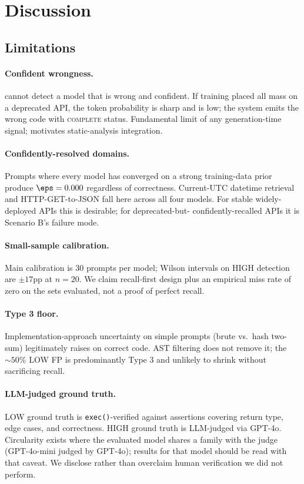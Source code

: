 \section{Discussion}
\label{sec:discussion}

\subsection{Limitations}
\label{subsec:limitations}

\paragraph{Confident wrongness.} \eps cannot detect a model that is
wrong and confident. If training placed all mass on a deprecated API,
the token probability is sharp and \eps is low; the system emits the
wrong code with \textsc{complete} status. Fundamental limit of any
generation-time signal; motivates static-analysis integration.

\paragraph{Confidently-resolved domains.} Prompts where every model
has converged on a strong training-data prior produce $\eps = 0.000$
regardless of correctness. Current-UTC datetime retrieval and
HTTP-GET-to-JSON fall here across all four models. For stable
widely-deployed APIs this is desirable; for deprecated-but-%
confidently-recalled APIs it is Scenario B's failure mode.

\paragraph{Small-sample calibration.} Main calibration is 30 prompts
per model; Wilson intervals on HIGH detection are $\pm 17$pp at
$n=20$. We claim recall-first design plus an empirical miss rate of
zero on the sets evaluated, not a proof of perfect recall.

\paragraph{Type 3 floor.} Implementation-approach uncertainty on
simple prompts (brute vs.\ hash two-sum) legitimately raises \eps on
correct code. AST filtering does not remove it; the $\sim 50\%$ LOW
FP is predominantly Type 3 and unlikely to shrink without sacrificing
recall.

\paragraph{LLM-judged ground truth.}\label{subsec:gt-disclosure}
LOW ground truth is \texttt{exec()}-verified against assertions covering
return type, edge cases, and correctness. HIGH ground truth is LLM-judged
via GPT-4o. Circularity exists where the evaluated model shares a family
with the judge (GPT-4o-mini judged by GPT-4o); results for that model
should be read with that caveat. We disclose rather than overclaim human
verification we did not perform.

